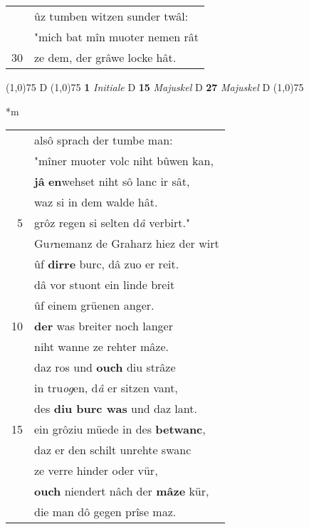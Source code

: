 \documentclass[8pt,a4paper,notitlepage]{article}
\begin{document}
\begin{table}[ht]
\begin{minipage}[t]{0.5\linewidth}
\begin{tabular}{rl}
 & ûz tumben witzen sunder twâl:\\ 
 & "mich bat mîn muoter nemen rât\\ 
30 & ze dem, der grâwe locke hât.\\ 
\end{tabular}
\scriptsize
\line(1,0){75} \newline
D \newline
\line(1,0){75} \newline
\textbf{1} \textit{Initiale} D  \textbf{15} \textit{Majuskel} D  \textbf{27} \textit{Majuskel} D  \newline
\line(1,0){75} \newline
\newline
\end{minipage}
\hspace{0.5cm}
\begin{minipage}[t]{0.5\linewidth}
\small
\begin{center}*m
\end{center}
\begin{tabular}{rl}
 & alsô sprach der tumbe man:\\ 
 & "mîner muoter volc niht bûwen kan,\\ 
 & \textbf{jâ} \textbf{en}wehset niht sô lanc ir sât,\\ 
 & waz si in dem walde hât.\\ 
5 & grôz regen si selten d\textit{â} verbirt."\\ 
 & Gu\textit{r}nemanz de Graharz hiez der wirt\\ 
 & ûf \textbf{dirre} burc, dâ zuo er reit.\\ 
 & dâ vor stuont ein linde breit\\ 
 & ûf einem grüenen anger.\\ 
10 & \textbf{der} was breiter noch langer\\ 
 & niht wanne ze rehter mâze.\\ 
 & daz ros und \textbf{ouch} diu strâze\\ 
 & in tru\textit{og}en, d\textit{â} er sitzen vant,\\ 
 & des \textbf{diu burc was} und daz lant.\\ 
15 & ein grôziu müede in des \textbf{betwanc},\\ 
 & daz er den schilt unrehte swanc\\ 
 & ze verre hinder oder vür,\\ 
 & \textbf{ouch} niendert nâch der \textbf{mâze} kür,\\ 
 & die man dô gegen prîse maz.\\ 

\end{tabular}
\end{minipage}
\end{table}
\end{document}
